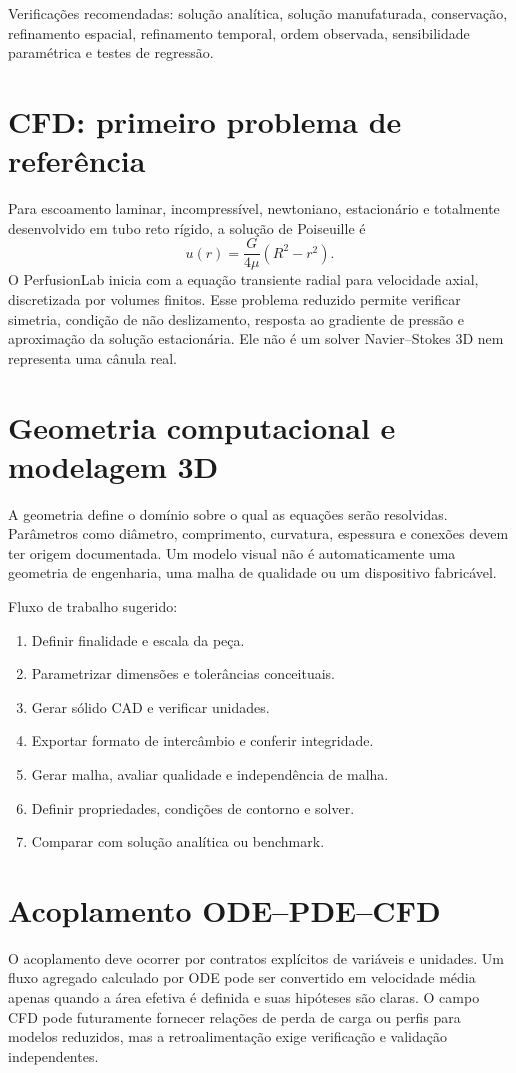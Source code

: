 \documentclass[11pt,a4paper,oneside]{book}
\begin{document}
Verificações recomendadas: solução analítica, solução manufaturada, conservação, refinamento espacial, refinamento temporal, ordem observada, sensibilidade paramétrica e testes de regressão.

\chapter{CFD: primeiro problema de referência}
Para escoamento laminar, incompressível, newtoniano, estacionário e totalmente desenvolvido em tubo reto rígido, a solução de Poiseuille é
\[
u(r)=\frac{G}{4\mu}(R^2-r^2).
\]
O PerfusionLab inicia com a equação transiente radial para velocidade axial, discretizada por volumes finitos. Esse problema reduzido permite verificar simetria, condição de não deslizamento, resposta ao gradiente de pressão e aproximação da solução estacionária. Ele não é um solver Navier--Stokes 3D nem representa uma cânula real.

\chapter{Geometria computacional e modelagem 3D}
A geometria define o domínio sobre o qual as equações serão resolvidas. Parâmetros como diâmetro, comprimento, curvatura, espessura e conexões devem ter origem documentada. Um modelo visual não é automaticamente uma geometria de engenharia, uma malha de qualidade ou um dispositivo fabricável.

Fluxo de trabalho sugerido:
\begin{enumerate}
\item Definir finalidade e escala da peça.
\item Parametrizar dimensões e tolerâncias conceituais.
\item Gerar sólido CAD e verificar unidades.
\item Exportar formato de intercâmbio e conferir integridade.
\item Gerar malha, avaliar qualidade e independência de malha.
\item Definir propriedades, condições de contorno e solver.
\item Comparar com solução analítica ou benchmark.
\end{enumerate}

\chapter{Acoplamento ODE--PDE--CFD}
O acoplamento deve ocorrer por contratos explícitos de variáveis e unidades. Um fluxo agregado calculado por ODE pode ser convertido em velocidade média apenas quando a área efetiva é definida e suas hipóteses são claras. O campo CFD pode futuramente fornecer relações de perda de carga ou perfis para modelos reduzidos, mas a retroalimentação exige verificação e validação independentes.
\end{document}
